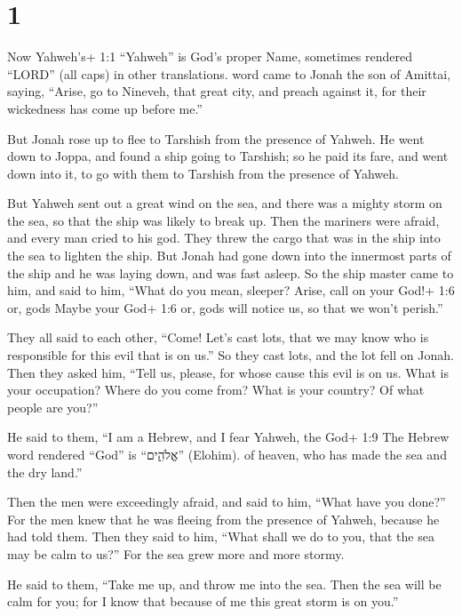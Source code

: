 \hypertarget{section}{%
\section{1}\label{section}}

 Now Yahweh's+ 1:1 ``Yahweh'' is God's proper Name,
sometimes rendered ``LORD'' (all caps) in other translations. word came
to Jonah the son of Amittai, saying,  ``Arise, go to
Nineveh, that great city, and preach against it, for their wickedness
has come up before me.''

 But Jonah rose up to flee to Tarshish from the presence of
Yahweh. He went down to Joppa, and found a ship going to Tarshish; so he
paid its fare, and went down into it, to go with them to Tarshish from
the presence of Yahweh.

 But Yahweh sent out a great wind on the sea, and there was
a mighty storm on the sea, so that the ship was likely to break up.
 Then the mariners were afraid, and every man cried to his
god. They threw the cargo that was in the ship into the sea to lighten
the ship. But Jonah had gone down into the innermost parts of the ship
and he was laying down, and was fast asleep.  So the ship
master came to him, and said to him, ``What do you mean, sleeper? Arise,
call on your God!+ 1:6 or, gods Maybe your God+ 1:6 or, gods will notice
us, so that we won't perish.''

 They all said to each other, ``Come! Let's cast lots, that
we may know who is responsible for this evil that is on us.'' So they
cast lots, and the lot fell on Jonah.  Then they asked him,
``Tell us, please, for whose cause this evil is on us. What is your
occupation? Where do you come from? What is your country? Of what people
are you?''

 He said to them, ``I am a Hebrew, and I fear Yahweh, the
God+ 1:9 The Hebrew word rendered ``God'' is ``אֱלֹהִ֑ים'' (Elohim). of
heaven, who has made the sea and the dry land.''

 Then the men were exceedingly afraid, and said to him,
``What have you done?'' For the men knew that he was fleeing from the
presence of Yahweh, because he had told them.  Then they
said to him, ``What shall we do to you, that the sea may be calm to
us?'' For the sea grew more and more stormy.

 He said to them, ``Take me up, and throw me into the sea.
Then the sea will be calm for you; for I know that because of me this
great storm is on you.''

